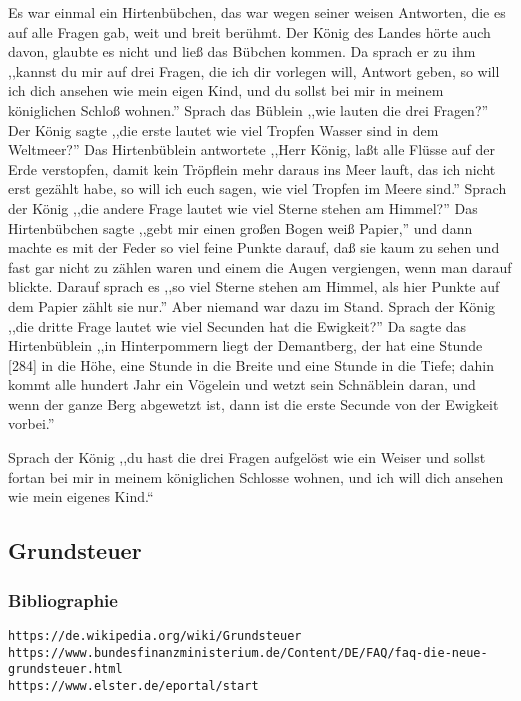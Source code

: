 \documentclass[10pt,a4paper]{article}
\begin{document}
\vskip 4pt
Es war einmal ein Hirtenbübchen, das war wegen seiner weisen Antworten, die es
auf alle Fragen gab, weit und breit berühmt. Der König des Landes hörte auch
davon, glaubte es nicht und ließ das Bübchen kommen. Da sprach er zu ihm
,,kannst du mir auf drei Fragen, die ich dir vorlegen will, Antwort geben, so
will ich dich ansehen wie mein eigen Kind, und du sollst bei mir in meinem
königlichen Schloß wohnen.'' Sprach das Büblein ,,wie lauten die drei Fragen?''
Der König sagte ,,die erste lautet wie viel Tropfen Wasser sind in dem
Weltmeer?'' Das Hirtenbüblein antwortete ,,Herr König, laßt alle Flüsse auf der
Erde verstopfen, damit kein Tröpflein mehr daraus ins Meer lauft, das ich nicht
erst gezählt habe, so will ich euch sagen, wie viel Tropfen im Meere sind.''
Sprach der König ,,die andere Frage lautet wie viel Sterne stehen am Himmel?''
Das Hirtenbübchen sagte ,,gebt mir einen großen Bogen weiß Papier,'' und dann
machte es mit der Feder so viel feine Punkte darauf, daß sie kaum zu sehen und
fast gar nicht zu zählen waren und einem die Augen vergiengen, wenn man darauf
blickte. Darauf sprach es ,,so viel Sterne stehen am Himmel, als hier Punkte auf
dem Papier zählt sie nur.'' Aber niemand war dazu im Stand. Sprach der König
,,die dritte Frage lautet wie viel Secunden hat die Ewigkeit?'' Da sagte das
Hirtenbüblein ,,in Hinterpommern liegt der Demantberg, der hat eine Stunde [284]
in die Höhe, eine Stunde in die Breite und eine Stunde in die Tiefe; dahin kommt
alle hundert Jahr ein Vögelein und wetzt sein Schnäblein daran, und wenn der
ganze Berg abgewetzt ist, dann ist die erste Secunde von der Ewigkeit vorbei.''

\vskip 4pt
Sprach der König ,,du hast die drei Fragen aufgelöst wie ein Weiser und sollst
fortan bei mir in meinem königlichen Schlosse wohnen, und ich will dich ansehen
wie mein eigenes Kind.“


\subsection{Grundsteuer}

\subsubsection{Bibliographie}

\verb+https://de.wikipedia.org/wiki/Grundsteuer+ \\
\verb+https://www.bundesfinanzministerium.de/Content/DE/FAQ/faq-die-neue-grundsteuer.html+ \\
\verb+https://www.elster.de/eportal/start+
\end{document}
